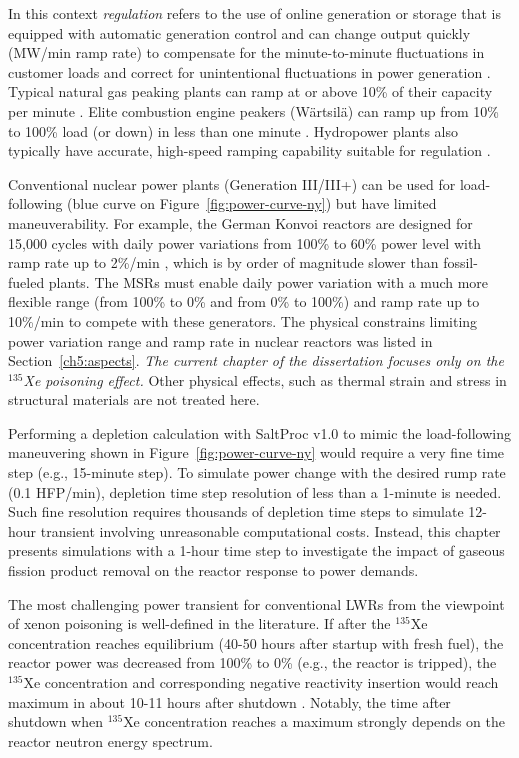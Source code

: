 In this context \emph{regulation} refers to the use of online generation or 
storage that is equipped with automatic generation control and can change 
output quickly (MW/min ramp rate) to compensate for the minute-to-minute 
fluctuations in customer loads and correct for unintentional fluctuations
in power generation \cite{kirby_method_2005}. Typical natural gas peaking 
plants can ramp at or above 10\% of their capacity per minute 
\cite{huff_enabling_2018}. Elite combustion engine peakers (W\"{a}rtsil\"{a}) 
can ramp up from 10\% to 100\% load (or down) in less than one minute 
\cite{wartsila_combustion_2020}. Hydropower plants also typically have 
accurate, high-speed ramping capability suitable for regulation 
\cite{kirby_method_2005}.

Conventional nuclear power plants (Generation III/III+) can be used for 
load-following (blue curve on Figure~\ref{fig:power-curve-ny}) but have 
limited maneuverability. For example, the German Konvoi reactors 
are designed for 15,000 cycles with daily power variations from 100\% to 60\% 
power level with ramp rate up to 2\%/min \cite{ludwig_load_2011}, which is by 
order of magnitude slower than fossil-fueled plants. 
The \glspl{MSR} must enable daily power variation with a much more flexible 
range (from 100\% to 0\% and from 0\% to 100\%) and ramp rate up to 10\%/min 
to compete with these generators. The physical constrains limiting power 
variation range and ramp rate in nuclear reactors was listed in 
Section~\ref{ch5:aspects}. 
\emph{The current chapter of the dissertation focuses only on the $^{135}$Xe 
poisoning effect.} Other physical effects, such as thermal strain and stress 
in structural materials are not treated here.


Performing a depletion calculation with SaltProc v1.0 to mimic the 
load-following maneuvering shown in Figure~\ref{fig:power-curve-ny} would 
require a very fine time step (e.g., 15-minute step). To simulate power change 
with the desired rump rate (0.1 \gls{HFP}/min), depletion time step resolution 
of less than a 1-minute is needed. 
Such fine resolution requires thousands of depletion time steps to simulate 
12-hour transient involving unreasonable computational costs. 
Instead, this chapter presents simulations with a 1-hour time step to 
investigate the impact of gaseous fission product removal on the reactor 
response to power demands. 

The most challenging power transient for conventional \glspl{LWR} from the 
viewpoint of xenon poisoning is well-defined in the literature. If after the 
$^{135}$Xe concentration reaches equilibrium (40-50 hours after startup with 
fresh fuel), the reactor power was decreased from 100\% to 0\% (e.g., the 
reactor is tripped), the $^{135}$Xe concentration and corresponding negative 
reactivity insertion would reach maximum in about 10-11 hours after shutdown 
\cite{lamarsh_introduction_1975, 
bell_nuclear_1970}. Notably, the time after 
shutdown when $^{135}$Xe concentration reaches a maximum strongly depends on 
the reactor neutron energy spectrum.

